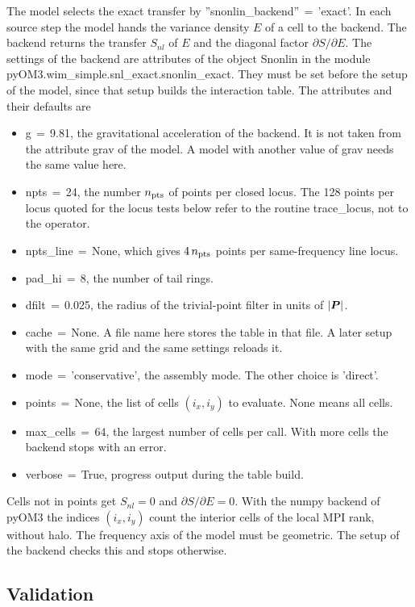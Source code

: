 \documentclass[12pt]{article}
\renewcommand{\v}[1]{{\mbox{\boldmath$ #1 $}}}  %
\newcommand{\p}{{\partial}}
\begin{document}
The model selects the exact transfer by
''snonlin\_backend''$\,=\,$'exact'.
In each source step the model hands the variance density $E$ of a cell to
the backend.
The backend returns the transfer $S_{nl}$ of $E$ and the diagonal factor
$\p S/\p E$.
The settings of the backend are attributes of the object Snonlin in the
module pyOM3.wim\_simple.snl\_exact.snonlin\_exact.
They must be set before the setup of the model, since that setup builds the
interaction table.
The attributes and their defaults are
\begin{itemize}
\item g$\,=\,$9.81, the gravitational acceleration of the backend.
It is not taken from the attribute grav of the model.
A model with another value of grav needs the same value here.
\item npts$\,=\,$24, the number $n_{\rm pts}$ of points per closed locus.
The 128 points per locus quoted for the locus tests below refer to the
routine trace\_locus, not to the operator.
\item npts\_line$\,=\,$None, which gives $4\, n_{\rm pts}$ points per
same-frequency line locus.
\item pad\_hi$\,=\,$8, the number of tail rings.
\item dfilt$\,=\,$0.025, the radius of the trivial-point filter in units
of $|\v P|$.
\item cache$\,=\,$None.
A file name here stores the table in that file.
A later setup with the same grid and the same settings reloads it.
\item mode$\,=\,$'conservative', the assembly mode.
The other choice is 'direct'.
\item points$\,=\,$None, the list of cells $(i_x, i_y)$ to evaluate.
None means all cells.
\item max\_cells$\,=\,$64, the largest number of cells per call.
With more cells the backend stops with an error.
\item verbose$\,=\,$True, progress output during the table build.
\end{itemize}
Cells not in points get $S_{nl} = 0$ and $\p S/\p E = 0$.
With the numpy backend of pyOM3 the indices $(i_x, i_y)$ count the interior
cells of the local MPI rank, without halo.
The frequency axis of the model must be geometric.
The setup of the backend checks this and stops otherwise.

\subsection*{Validation}
\end{document}
